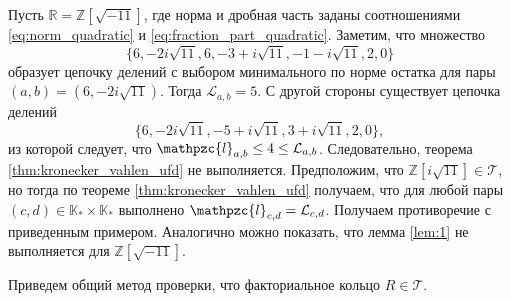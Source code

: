 \documentclass[_00_dissertation.tex]{subfiles}
\begin{document}
\begin{example}\label{example:Z[sqrt{-11}]}
    Пусть $\mathbb{R}=\mathbb{Z}[\sqrt{-11}]$, где норма и дробная часть заданы соотношениями \ref{eq:norm_quadratic} и \ref{eq:fraction_part_quadratic}.
    Заметим, что множество
    \begin{equation*}
        \{6,-2i\sqrt{11},6,-3+i\sqrt{11},-1-i\sqrt{11},2,0\}
    \end{equation*}
    образует цепочку делений с выбором минимального по норме остатка для пары $(a,b)=(6,-2i\sqrt{11})$.
    Тогда $\mathcal{L}_{a,b}=5$.
    С другой стороны существует цепочка делений
    \begin{equation*}
        \{6,-2i\sqrt{11},-5+i\sqrt{11},3+i\sqrt{11},2,0\},
    \end{equation*}
    из которой следует, что $\mathpzc{l}_{a,b}\le 4\le \mathcal{L}_{a,b}$.
    Следовательно, теорема \ref{thm:kronecker_vahlen_ufd} не выполняется.
    Предположим, что $\mathbb{Z}[i\sqrt{11}]\in\mathcal{T}$, но тогда по теореме \ref{thm:kronecker_vahlen_ufd} получаем, что для любой пары $(c,d)\in\mathbb{K}_* \times\mathbb{K}_*$ выполнено $\mathpzc{l}_{c,d}=\mathcal{L}_{c,d}$.
    Получаем противоречие с приведенным примером.
    Аналогично можно показать, что лемма \ref{lem:1} не выполняется для $\mathbb{Z}[\sqrt{-11}].$
\end{example}

Приведем общий метод проверки, что факториальное кольцо $R \in \mathcal{T}$.
\end{document}
